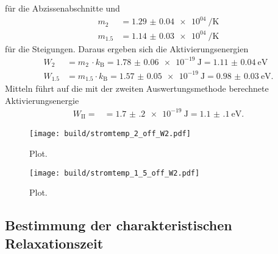 für die Abzissenabschnitte und
\begin{align}
  m_{2} &= \SI{1.29(4)e04}{\per\kelvin} \\
  m_{1.5} &= \SI{1.14(3)e04}{\per\kelvin}
\end{align}
für die Steigungen. Daraus ergeben sich die Aktivierungsenergien
\begin{align}
  W_{2} &= m_{2} \, \cdot k_\text{B} = \SI{1.78(6)e-19}{\joule} = \SI{1.11(4)}{\electronvolt} \\
  W_{1.5} &= m_{1.5} \cdot k_\text{B} = \SI{1.57(5)e-19}{\joule} = \SI{0.98(3)}{\electronvolt}.
\end{align}
Mitteln führt auf die mit der zweiten Auswertungsmethode berechnete Aktivierungsenergie
\begin{align}
  W_{\text{II}} = &= \SI{1.7(2)e-19}{\joule} = \SI{1.1(1)}{\electronvolt}.
\label{eqn:akt2}
\end{align}

\begin{figure}
  \centering
  \texttt{[image: build/stromtemp\_2\_off\_W2.pdf]}
  \caption{Plot.}
  \label{fig:messwerte2offW2}
\end{figure}

\begin{figure}
  \centering
  \texttt{[image: build/stromtemp\_1\_5\_off\_W2.pdf]}
  \caption{Plot.}
  \label{fig:messwerte15offW2}
\end{figure}

\subsection{Bestimmung der charakteristischen Relaxationszeit}

